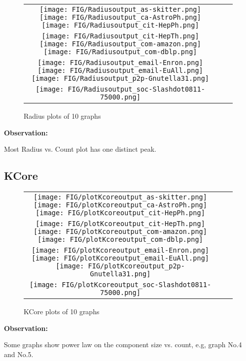 \begin{figure}[H]
\begin{center}
\begin{tabular}{ccc}
     \texttt{[image: FIG/Radiusoutput\_as-skitter.png]} 
     \texttt{[image: FIG/Radiusoutput\_ca-AstroPh.png]}
     \texttt{[image: FIG/Radiusoutput\_cit-HepPh.png]} \\
     \texttt{[image: FIG/Radiusoutput\_cit-HepTh.png]} 
     \texttt{[image: FIG/Radiusoutput\_com-amazon.png]} 
     \texttt{[image: FIG/Radiusoutput\_com-dblp.png]} \\
     \texttt{[image: FIG/Radiusoutput\_email-Enron.png]} 
     \texttt{[image: FIG/Radiusoutput\_email-EuAll.png]} 
     \texttt{[image: FIG/Radiusoutput\_p2p-Gnutella31.png]} \\
     \texttt{[image: FIG/Radiusoutput\_soc-Slashdot0811-75000.png]} 
\end{tabular}
\caption{Radius plots of 10 graphs}
\label{fig:results}
\end{center}
\end{figure}

\textbf{Observation:}
\par Most Radius vs. Count plot has one distinct peak.

\subsection{KCore}

\begin{figure}[H]
\begin{center}
\begin{tabular}{ccc}
     \texttt{[image: FIG/plotKcoreoutput\_as-skitter.png]} 
     \texttt{[image: FIG/plotKcoreoutput\_ca-AstroPh.png]}
     \texttt{[image: FIG/plotKcoreoutput\_cit-HepPh.png]} \\
     \texttt{[image: FIG/plotKcoreoutput\_cit-HepTh.png]} 
     \texttt{[image: FIG/plotKcoreoutput\_com-amazon.png]} 
     \texttt{[image: FIG/plotKcoreoutput\_com-dblp.png]} \\
     \texttt{[image: FIG/plotKcoreoutput\_email-Enron.png]} 
     \texttt{[image: FIG/plotKcoreoutput\_email-EuAll.png]} 
     \texttt{[image: FIG/plotKcoreoutput\_p2p-Gnutella31.png]} \\
     \texttt{[image: FIG/plotKcoreoutput\_soc-Slashdot0811-75000.png]} 
\end{tabular}
\caption{KCore plots of 10 graphs}
\label{fig:results}
\end{center}
\end{figure}

\textbf{Observation:}
\par Some graphs show power law on the component size vs. count, e.g, graph No.4 and No.5.